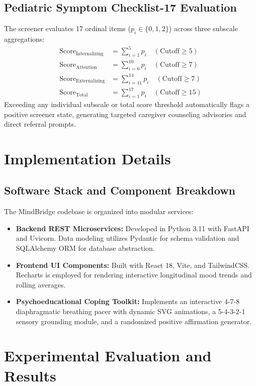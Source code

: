 \documentclass[conference]{IEEEtran}
\begin{document}
\subsection{Pediatric Symptom Checklist-17 Evaluation}
The screener evaluates 17 ordinal items ($p_i \in \{0, 1, 2\}$) across three subscale aggregations:
\begin{align}
\text{Score}_{\text{Internalizing}} &= \sum_{i=1}^{5} p_i \quad (\text{Cutoff} \ge 5) \\
\text{Score}_{\text{Attention}} &= \sum_{i=6}^{10} p_i \quad (\text{Cutoff} \ge 7) \\
\text{Score}_{\text{Externalizing}} &= \sum_{i=11}^{14} p_i \quad (\text{Cutoff} \ge 7) \\
\text{Score}_{\text{Total}} &= \sum_{i=1}^{17} p_i \quad (\text{Cutoff} \ge 15)
\end{align}
Exceeding any individual subscale or total score threshold automatically flags a positive screener state, generating targeted caregiver counseling advisories and direct referral prompts.

\section{Implementation Details}
\label{sec:implementation}

\subsection{Software Stack and Component Breakdown}
The MindBridge codebase is organized into modular services:
\begin{itemize}
    \item \textbf{Backend REST Microservices:} Developed in Python 3.11 with FastAPI and Uvicorn. Data modeling utilizes Pydantic for schema validation and SQLAlchemy ORM for database abstraction.
    \item \textbf{Frontend UI Components:} Built with React 18, Vite, and TailwindCSS. Recharts is employed for rendering interactive longitudinal mood trends and rolling averages.
    \item \textbf{Psychoeducational Coping Toolkit:} Implements an interactive 4-7-8 diaphragmatic breathing pacer with dynamic SVG animations, a 5-4-3-2-1 sensory grounding module, and a randomized positive affirmation generator.
\end{itemize}

\section{Experimental Evaluation and Results}
\label{sec:results}
\end{document}
